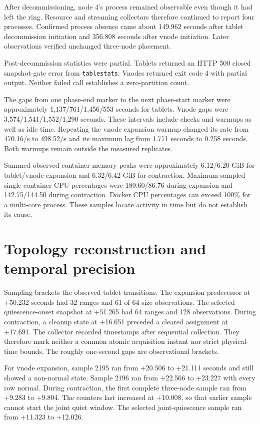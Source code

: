 After decommissioning, node 4's process remained observable even though it had left the ring. Resource and streaming collectors therefore continued to report four processes. Confirmed process absence came about 149.962 seconds after tablet decommission initiation and 356.808 seconds after vnode initiation. Later observations verified unchanged three-node placement.

Post-decommission statistics were partial. Tablets returned an HTTP 500 closed snapshot-gate error from \texttt{tablestats}. Vnodes returned exit code 4 with partial output. Neither failed call establishes a zero-partition count.

The gaps from one phase-end marker to the next phase-start marker were approximately 1,137/761/1,456/553 seconds for tablets. Vnode gaps were 3,574/1,541/1,552/1,290 seconds. These intervals include checks and warmups as well as idle time. Repeating the vnode expansion warmup changed its rate from 470.16/s to 498.52/s and its maximum lag from 1.771 seconds to 0.258 seconds. Both warmups remain outside the measured replicates.

Summed observed container-memory peaks were approximately 6.12/6.20 GiB for tablet/vnode expansion and 6.32/6.42 GiB for contraction. Maximum sampled single-container CPU percentages were 189.60/86.76 during expansion and 142.75/144.50 during contraction. Docker CPU percentages can exceed 100\% for a multi-core process. These samples locate activity in time but do not establish its cause.

\newpage

\hypertarget{topology-reconstruction-and-temporal-precision}{%
\section{Topology reconstruction and temporal
precision}\label{topology-reconstruction-and-temporal-precision}}

Sampling brackets the observed tablet transitions. The expansion predecessor at +50.232 seconds had 32 ranges and 61 of 64 size observations. The selected quiescence-onset snapshot at +51.265 had 64 ranges and 128 observations. During contraction, a cleanup state at +16.651 preceded a cleared assignment at +17.691. The collector recorded timestamps after sequential collection. They therefore mark neither a common atomic acquisition instant nor strict physical-time bounds. The roughly one-second gaps are observational brackets.

For vnode expansion, sample 2195 ran from +20.506 to +21.111 seconds and still showed a non-normal state. Sample 2196 ran from +22.566 to +23.227 with every row normal. During contraction, the first complete three-node sample ran from +9.283 to +9.804. The counters last increased at +10.008, so that earlier sample cannot start the joint quiet window. The selected joint-quiescence sample ran from +11.323 to +12.026.

